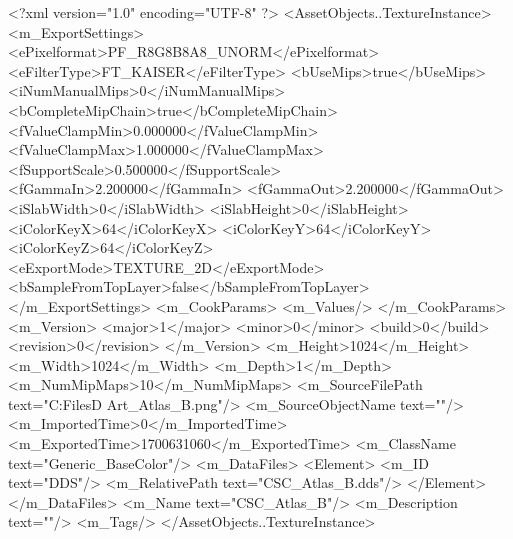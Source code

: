 <?xml version="1.0" encoding="UTF-8" ?>
<AssetObjects..TextureInstance>
	<m_ExportSettings>
		<ePixelformat>PF_R8G8B8A8_UNORM</ePixelformat>
		<eFilterType>FT_KAISER</eFilterType>
		<bUseMips>true</bUseMips>
		<iNumManualMips>0</iNumManualMips>
		<bCompleteMipChain>true</bCompleteMipChain>
		<fValueClampMin>0.000000</fValueClampMin>
		<fValueClampMax>1.000000</fValueClampMax>
		<fSupportScale>0.500000</fSupportScale>
		<fGammaIn>2.200000</fGammaIn>
		<fGammaOut>2.200000</fGammaOut>
		<iSlabWidth>0</iSlabWidth>
		<iSlabHeight>0</iSlabHeight>
		<iColorKeyX>64</iColorKeyX>
		<iColorKeyY>64</iColorKeyY>
		<iColorKeyZ>64</iColorKeyZ>
		<eExportMode>TEXTURE_2D</eExportMode>
		<bSampleFromTopLayer>false</bSampleFromTopLayer>
	</m_ExportSettings>
	<m_CookParams>
		<m_Values/>
	</m_CookParams>
	<m_Version>
		<major>1</major>
		<minor>0</minor>
		<build>0</build>
		<revision>0</revision>
	</m_Version>
	<m_Height>1024</m_Height>
	<m_Width>1024</m_Width>
	<m_Depth>1</m_Depth>
	<m_NumMipMaps>10</m_NumMipMaps>
	<m_SourceFilePath text="C:\Users\Shadow\Desktop\Working Files\3D Art\Textures\CSC_Atlas_B.png"/>
	<m_SourceObjectName text=""/>
	<m_ImportedTime>0</m_ImportedTime>
	<m_ExportedTime>1700631060</m_ExportedTime>
	<m_ClassName text="Generic_BaseColor"/>
	<m_DataFiles>
		<Element>
			<m_ID text="DDS"/>
			<m_RelativePath text="CSC_Atlas_B.dds"/>
		</Element>
	</m_DataFiles>
	<m_Name text="CSC_Atlas_B"/>
	<m_Description text=""/>
	<m_Tags/>
</AssetObjects..TextureInstance>

